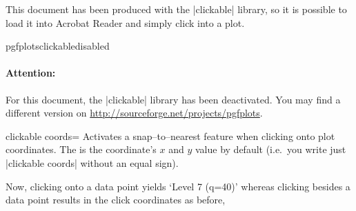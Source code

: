 	This document has been produced with the |clickable| library, so it is possible to load it into Acrobat Reader and simply click into a plot.
	
	\expandafter\ifx\csname pgfplotsclickabledisabled\endcsname\relax
	\else
	\paragraph{Attention:} For this document, the |clickable| library has been deactivated. You may find a different version on \url{http://sourceforge.net/projects/pgfplots}.
	\fi

\begin{pgfplotskey}{clickable coords=}
	Activates a snap--to--nearest feature when clicking onto plot coordinates. The  is the coordinate's $x$ and $y$ value by default (i.e.\ you write just |clickable coords| without an equal sign).
\begin{codeexample}[]
\end{codeexample}
	\noindent Now, clicking onto a data point yields `Level 7 (q=40)' 
	whereas clicking besides a data point results in the click coordinates as before,
	

\end{pgfplotskey}
